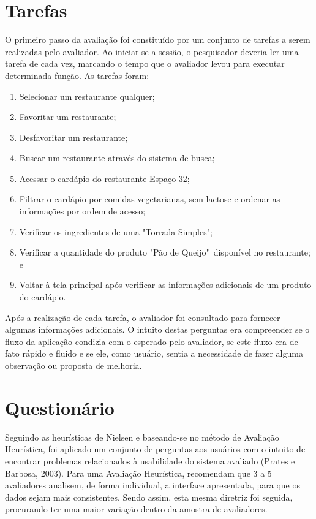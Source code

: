 \section{Tarefas}
O primeiro passo da avaliação foi constituído por um conjunto de tarefas a serem realizadas pelo avaliador. Ao iniciar-se a sessão, o pesquisador deveria ler uma tarefa de cada vez, marcando o tempo que o avaliador levou para executar determinada função. As tarefas foram:
\begin{enumerate}
	\item Selecionar um restaurante qualquer;
	\item Favoritar um restaurante;
	\item Desfavoritar um restaurante;
	\item Buscar um restaurante através do sistema de busca;
	\item Acessar o cardápio do restaurante Espaço 32;
	\item Filtrar o cardápio por comidas vegetarianas, sem lactose e ordenar as informações por ordem de acesso;
	\item Verificar os ingredientes de uma "Torrada Simples";
	\item Verificar a quantidade do produto "Pão de Queijo"\ disponível no restaurante; e
	\item Voltar à tela principal após verificar as informações adicionais de um produto do cardápio.
\end{enumerate}
Após a realização de cada tarefa, o avaliador foi consultado para fornecer algumas informações adicionais. O intuito destas perguntas era compreender se o fluxo da aplicação condizia com o esperado pelo avaliador, se este fluxo era de fato rápido e fluido e se ele, como usuário, sentia a necessidade de fazer alguma observação ou proposta de melhoria.

\section{Questionário}

Seguindo as heurísticas de Nielsen \cite{NIELSEN1995} e baseando-se no método de Avaliação Heurística, foi aplicado um conjunto de perguntas aos usuários com o intuito de encontrar problemas relacionados à usabilidade do sistema avaliado (Prates e Barbosa, 2003). Para uma Avaliação Heurística, \cite{WINCKLER2002} recomendam que 3 a 5 avaliadores analisem, de forma individual, a interface apresentada, para que os dados sejam mais consistentes. Sendo assim, esta mesma diretriz foi seguida, procurando ter uma maior variação dentro da amostra de avaliadores.

